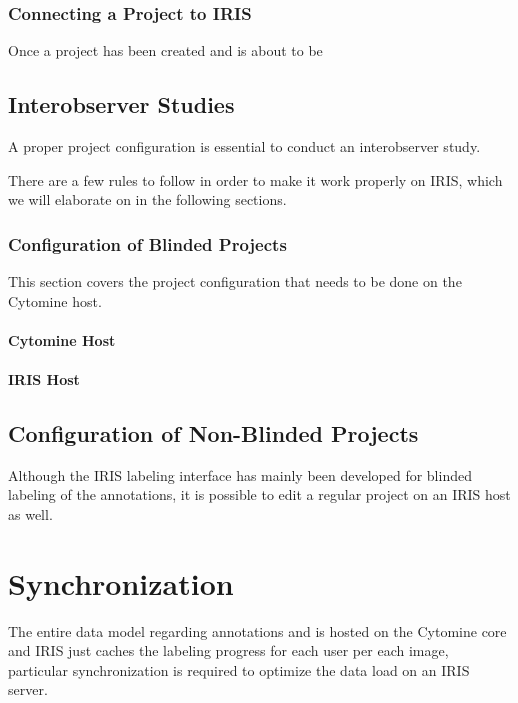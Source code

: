 \subsection{Connecting a Project to IRIS}
Once a project has been created and is about to be 


 

\section{Interobserver Studies}
A proper project configuration is essential to conduct an interobserver study. 

There are a few rules to follow in order to make it work properly on IRIS, which we will elaborate on in the following sections. 

\subsection{Configuration of Blinded Projects}
This section covers the project configuration that needs to be done on the Cytomine host. 

\subsubsection{Cytomine Host}

\subsubsection{IRIS Host}


\section{Configuration of Non-Blinded Projects}
Although the IRIS labeling interface has mainly been developed for blinded labeling of the annotations, it is possible to edit a regular project on an IRIS host as well. 




\chapter{Synchronization}
The entire data model regarding annotations and is hosted on the Cytomine core and IRIS just caches the labeling progress for each user per each image, particular synchronization is required to optimize the data load on an IRIS server. 

